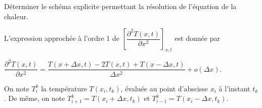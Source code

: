 \documentclass[10pt,fleqn]{article} %
\begin{document}
\begin{multicols}{2}
\begin{multicols}{2}
\begin{obj}
Déterminer le schéma explicite permettant la résolution de l'équation de la chaleur.
\end{obj}
%


L'expression approchée à l'ordre 1 de  $\left[\dfrac{\partial^2 T(x,t)}{\partial x^2}\right]_{x,t}$
 est donnée par 
 
 $
\dfrac{\partial^2 T(x,t)}{\partial x^2} 
=
\dfrac{T(x+\Delta x,t)-2T(x,t) + T(x-\Delta x,t)}{\Delta x^2 }+ o\left(\Delta x\right)
$.
 
%
%
%
On note $T_i^k$ la température $T\left(x_i,t_k\right)$, évaluée au point d'abscisse $x_i$ à
 l'instant $t_k$. De même, on note $T_{i+1}^k=T\left(x_i + \Delta x,t_k \right)$ et 
$T_{i-1}^k=T\left(x_i - \Delta x,t_k \right)$.



\end{multicols}
\end{multicols}
\end{document}
